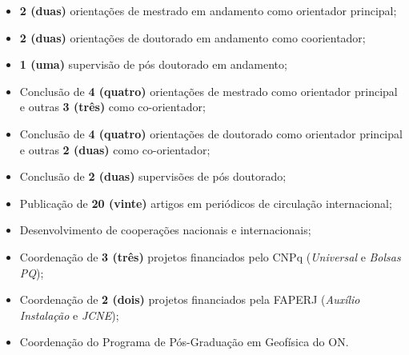 \begin{itemize}
	\item[\parbox{0.03\textwidth}{\vspace{-0.1\baselineskip}\faHandHoldingWater}]
	\textbf{2 (duas)} orientações de mestrado em andamento como orientador principal;
	\item[\parbox{0.03\textwidth}{\vspace{-0.1\baselineskip}\faHandsHelping}]
	\textbf{2 (duas)} orientações de doutorado em andamento como coorientador;
	\item[\parbox{0.03\textwidth}{\vspace{-0.1\baselineskip}\faHandshake}]
	\textbf{1 (uma)} supervisão de pós doutorado em andamento;
	\item[\parbox{0.03\textwidth}{\vspace{-0.1\baselineskip}\faGraduationCap}]
	Conclusão de \textbf{4 (quatro)} orientações de mestrado como orientador principal e outras \textbf{3 (três)} como co-orientador;
	\item[\parbox{0.03\textwidth}{\vspace{-0.1\baselineskip}\faGraduationCap}]
	Conclusão de \textbf{4 (quatro)} orientações de doutorado como orientador principal e outras \textbf{2 (duas)} como co-orientador;
	\item[\parbox{0.025\textwidth}{\vspace{-0.1\baselineskip}\faGlasses}]
	Conclusão de \textbf{2 (duas)} supervisões de pós doutorado;
	\item[\parbox{0.03\textwidth}{\vspace{-0.1\baselineskip}\faPencil*}]
	Publicação de \textbf{20 (vinte)} artigos em periódicos de circulação internacional;
	\item[\parbox{0.03\textwidth}{\vspace{-0.1\baselineskip}\faPeopleCarry}]
	Desenvolvimento de cooperações nacionais e internacionais;
	\item[\parbox{0.03\textwidth}{\vspace{-0.1\baselineskip}\aiIDEASRePEc}] 
	Coordenação de \textbf{3 (três)} projetos financiados pelo CNPq
	(\textit{Universal} e \textit{Bolsas PQ});
	\item[\parbox{0.03\textwidth}{\vspace{-0.1\baselineskip}\aiIDEASRePEc}]
	Coordenação de \textbf{2 (dois)} projetos financiados pela FAPERJ
	(\textit{Auxílio Instalação} e \textit{JCNE});
	\item[\parbox{0.03\textwidth}{\vspace{-0.1\baselineskip}\faBomb}]
	Coordenação do Programa de Pós-Graduação em Geofísica do ON.

\end{itemize}
